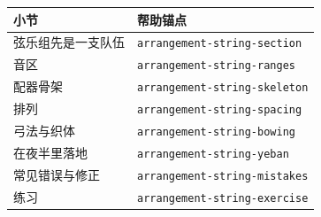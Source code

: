 \begin{helpmapping}
\begin{longtable}{p{}p{}}
\toprule
小节 & 帮助锚点 \\
\midrule
弦乐组先是一支队伍 & \texttt{arrangement-string-section} \\
音区 & \texttt{arrangement-string-ranges} \\
配器骨架 & \texttt{arrangement-string-skeleton} \\
排列 & \texttt{arrangement-string-spacing} \\
弓法与织体 & \texttt{arrangement-string-bowing} \\
在夜半里落地 & \texttt{arrangement-string-yeban} \\
常见错误与修正 & \texttt{arrangement-string-mistakes} \\
练习 & \texttt{arrangement-string-exercise} \\
\bottomrule
\end{longtable}
\end{helpmapping}
